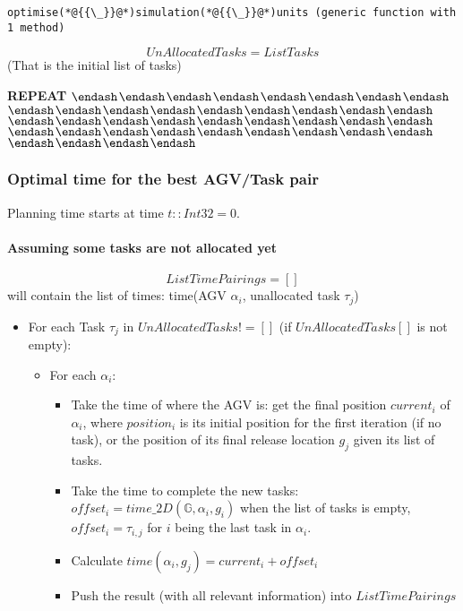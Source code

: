 \documentclass[12pt,a4paper]{article}
\begin{document}
\begin{lstlisting}
optimise(*@{{\_}}@*)simulation(*@{{\_}}@*)units (generic function with 1 method)
\end{lstlisting}


\[
UnAllocatedTasks = ListTasks
\]
(That is the initial list of tasks)

\textbf{REPEAT} \ensuremath{\endash}\ensuremath{\endash}\ensuremath{\endash}\ensuremath{\endash}\ensuremath{\endash}\ensuremath{\endash}\ensuremath{\endash}\ensuremath{\endash}\ensuremath{\endash}\ensuremath{\endash}\ensuremath{\endash}\ensuremath{\endash}\ensuremath{\endash}\ensuremath{\endash}\ensuremath{\endash}\ensuremath{\endash}\ensuremath{\endash}\ensuremath{\endash}\ensuremath{\endash}\ensuremath{\endash}\ensuremath{\endash}\ensuremath{\endash}\ensuremath{\endash}\ensuremath{\endash}\ensuremath{\endash}\ensuremath{\endash}\ensuremath{\endash}\ensuremath{\endash}\ensuremath{\endash}\ensuremath{\endash}\ensuremath{\endash}\ensuremath{\endash}\ensuremath{\endash}\ensuremath{\endash}\ensuremath{\endash}\ensuremath{\endash}\ensuremath{\endash}\ensuremath{\endash}\ensuremath{\endash}

\subsubsection{Optimal time for the best AGV/Task pair}
Planning time starts at time $t::Int32=0$.

\paragraph{Assuming some tasks are not allocated yet}
\[
ListTimePairings = []
\]
will contain the list of times: time(AGV $\alpha_i$, unallocated task $\tau_j$)

\begin{itemize}
\item For each Task $\tau_j$ in $UnAllocatedTasks != []$ (if $UnAllocatedTasks[]$ is not empty):

\begin{itemize}
\item For each $\alpha_i$:

\begin{itemize}
\item Take the time of where the AGV is: get the final position $current_i$ of $\alpha_i$, where $position_i$ is its initial position for the first iteration (if no task), or the position of its final release location $g_j$ given its list of tasks.


\item Take the time to complete the new tasks: $offset_i = time\_2D(\mathbb{G}, \alpha_i, g_i)$ when the list of tasks is empty, $offset_i = \tau_{i, j}$ for $i$ being the last task in $\alpha_i$.


\item Calculate $time(\alpha_i, g_j) = current_i + offset_i$


\item Push the result (with all relevant information) into $ListTimePairings$

\end{itemize}
\end{itemize}
\end{itemize}
\end{document}
